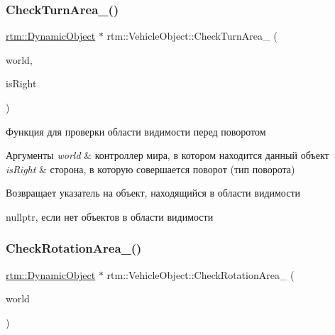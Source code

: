 \subsubsection{\texorpdfstring{Check\+Turn\+Area\+\_\+()}{CheckTurnArea\_()}}
{\footnotesize\ttfamily \hyperlink{classrtm_1_1_dynamic_object}{rtm\+::\+Dynamic\+Object} $\ast$ rtm\+::\+Vehicle\+Object\+::\+Check\+Turn\+Area\+\_\+ (\begin{DoxyParamCaption}\item[{\hyperlink{classrtm_1_1_world_controller}{World\+Controller} $\ast$const}]{world,  }\item[{bool}]{is\+Right }\end{DoxyParamCaption})\hspace{0.3cm}{\ttfamily [protected]}}



Функция для проверки области видимости перед поворотом 


\begin{DoxyParams}{Аргументы}
{\em world} & контроллер мира, в котором находится данный объект \\
\hline
{\em is\+Right} & сторона, в которую совершается поворот (тип поворота) \\
\hline
\end{DoxyParams}
\begin{DoxyReturn}{Возвращает}
указатель на объект, находящийся в области видимости 

nullptr, если нет объектов в области видимости 
\end{DoxyReturn}
\mbox{\label{classrtm_1_1_vehicle_object_a377af8433f7cd5cf99d8ab432dbc4e44}} 
\subsubsection{\texorpdfstring{Check\+Rotation\+Area\+\_\+()}{CheckRotationArea\_()}}
{\footnotesize\ttfamily \hyperlink{classrtm_1_1_dynamic_object}{rtm\+::\+Dynamic\+Object} $\ast$ rtm\+::\+Vehicle\+Object\+::\+Check\+Rotation\+Area\+\_\+ (\begin{DoxyParamCaption}\item[{\hyperlink{classrtm_1_1_world_controller}{World\+Controller} $\ast$const}]{world }\end{DoxyParamCaption})\hspace{0.3cm}{\ttfamily [protected]}}



